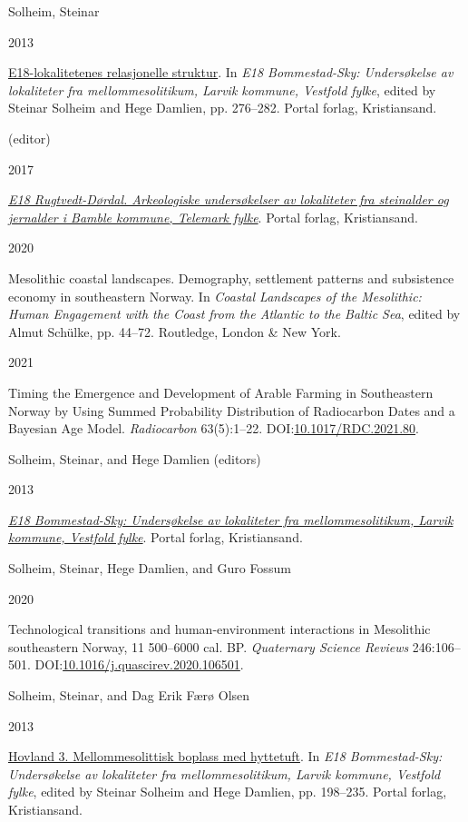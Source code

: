 \documentclass[
  12pt,
  a4paper,
  oneside]{book}
\newlength{\cslhangindent}
\newlength{\csllabelwidth}
\newlength{\cslentryspacingunit} %
\newenvironment{CSLReferences}[2] %
 {%
  \setlength{\parindent}{0pt}
  \ifodd #1
  \let\oldpar\par
  \def\par{\hangindent=\cslhangindent\oldpar}
  \fi
  \setlength{\parskip}{#2\cslentryspacingunit}
 }%
 {}
\newcommand{\CSLBlock}[1]{#1\hfill\break}
\newcommand{\CSLLeftMargin}[1]{\parbox[t]{\csllabelwidth}{#1}}
\newcommand{\CSLRightInline}[1]{\parbox[t]{\linewidth - \csllabelwidth}{#1}\break}
\begin{document}
\begin{CSLReferences}{0}{0}
\leavevmode{}%
\CSLBlock{Solheim, Steinar}
\CSLLeftMargin{ 2013}%
\CSLRightInline{\href{https://doi.org/10.23865/noasp.53}{{E18-lokalitetenes relasjonelle struktur}}. In \emph{{E18 Bommestad-Sky: Undersøkelse av lokaliteter fra mellommesolitikum, Larvik kommune, Vestfold fylke}}, edited by Steinar Solheim and Hege Damlien, pp. 276--282. Portal forlag, Kristiansand.}

\leavevmode{}%
\CSLBlock{ (editor)}
\CSLLeftMargin{ 2017}%
\CSLRightInline{\emph{\href{https://doi.org/10.23865/noasp.58}{{E18 Rugtvedt-Dørdal. Arkeologiske undersøkelser av lokaliteter fra steinalder og jernalder i Bamble kommune, Telemark fylke}}}. Portal forlag, Kristiansand.}

\leavevmode{}%
\CSLLeftMargin{ 2020 }%
\CSLRightInline{{Mesolithic coastal landscapes. Demography, settlement patterns and subsistence economy in southeastern Norway}. In \emph{{Coastal Landscapes of the Mesolithic: Human Engagement with the Coast from the Atlantic to the Baltic Sea}}, edited by Almut Schülke, pp. 44--72. Routledge, London \& New York.}

\leavevmode{}%
\CSLLeftMargin{ 2021 }%
\CSLRightInline{Timing the Emergence and Development of Arable Farming in Southeastern Norway by Using Summed Probability Distribution of Radiocarbon Dates and a Bayesian Age Model. \emph{Radiocarbon} 63(5):1--22. DOI:\href{https://doi.org/10.1017/RDC.2021.80}{10.1017/RDC.2021.80}.}

\leavevmode{}%
\CSLBlock{Solheim, Steinar, and Hege Damlien (editors)}
\CSLLeftMargin{ 2013}%
\CSLRightInline{\emph{\href{https://doi.org/10.23865/noasp.53}{{E18 Bommestad-Sky: Undersøkelse av lokaliteter fra mellommesolitikum, Larvik kommune, Vestfold fylke}}}. Portal forlag, Kristiansand.}

\leavevmode{}%
\CSLBlock{Solheim, Steinar, Hege Damlien, and Guro Fossum}
\CSLLeftMargin{ 2020}%
\CSLRightInline{Technological transitions and human-environment interactions in Mesolithic southeastern Norway, 11 500--6000 cal. BP. \emph{Quaternary Science Reviews} 246:106--501. DOI:\href{https://doi.org/10.1016/j.quascirev.2020.106501}{10.1016/j.quascirev.2020.106501}.}

\leavevmode{}%
\CSLBlock{Solheim, Steinar, and Dag Erik Færø Olsen}
\CSLLeftMargin{ 2013}%
\CSLRightInline{\href{https://doi.org/10.23865/noasp.53}{{Hovland 3. Mellommesolittisk boplass med hyttetuft}}. In \emph{{E18 Bommestad-Sky: Undersøkelse av lokaliteter fra mellommesolitikum, Larvik kommune, Vestfold fylke}}, edited by Steinar Solheim and Hege Damlien, pp. 198--235. Portal forlag, Kristiansand.}


\end{CSLReferences}
\end{document}
